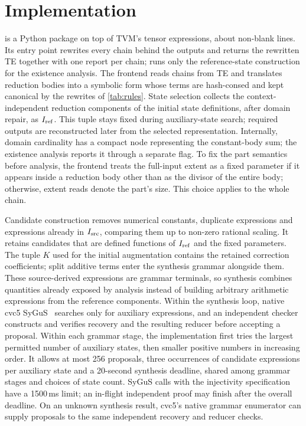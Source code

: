 \section{Implementation}
\label{sec:impl}

\sys is a Python package on top of TVM's tensor expressions, about \nLoC{} non-blank lines.
Its entry point  rewrites every chain behind the outputs and returns the rewritten TE together with one report per chain;  runs only the reference-state construction for the existence analysis.
The frontend reads chains from TE and translates reduction bodies into a symbolic form whose terms are hash-consed and kept canonical by the rewrites of \cref{tab:rules}.
State selection collects the context-independent reduction components of the initial state definitions, after domain repair, as $I_{\mathrm{ref}}$.
This tuple stays fixed during auxiliary-state search; required outputs are reconstructed later from the selected representation.
Internally, domain cardinality has a compact node representing the constant-body sum; the existence analysis reports it through a separate flag.
To fix the part semantics before analysis, the frontend treats the full-input extent as a fixed parameter if it appears inside a reduction body other than as the divisor of the entire body; otherwise, extent reads denote the part's size.
This choice applies to the whole chain.

Candidate construction removes numerical constants, duplicate expressions and expressions already in $I_{\mathrm{src}}$, comparing them up to non-zero rational scaling.
It retains candidates that are defined functions of $I_{\mathrm{ref}}$ and the fixed parameters.
The tuple $K$ used for the initial augmentation contains the retained correction coefficients; split additive terms enter the synthesis grammar alongside them.
These source-derived expressions are grammar terminals, so synthesis combines quantities already exposed by analysis instead of building arbitrary arithmetic expressions from the reference components.
Within the synthesis loop, native cvc5 SyGuS~\citep{cvc5} searches only for auxiliary expressions, and an independent checker constructs and verifies recovery and the resulting reducer before accepting a proposal.
Within each grammar stage, the implementation first tries the largest permitted number of auxiliary states, then smaller positive numbers in increasing order.
It allows at most 256 proposals, three occurrences of candidate expressions per auxiliary state and a 20-second synthesis deadline, shared among grammar stages and choices of state count.
SyGuS calls with the injectivity specification have a 1500\,ms limit; an in-flight independent proof may finish after the overall deadline.
On an unknown synthesis result, cvc5's native grammar enumerator can supply proposals to the same independent recovery and reducer checks.

